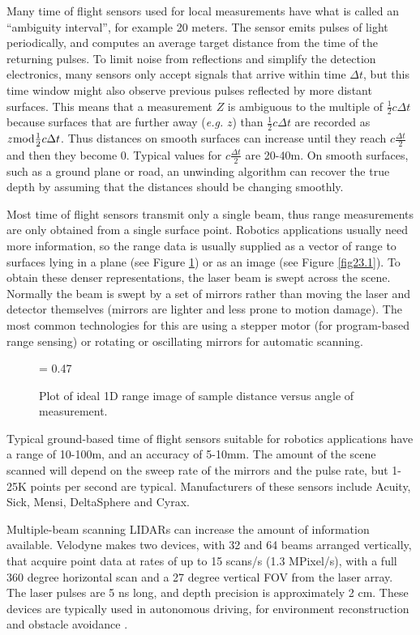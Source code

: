 \documentclass[twocolumn,oneside]{book}
\begin{document}
Many time of flight sensors used for local measurements have what is 
called an ``ambiguity interval'', for example 20 meters.
The sensor emits pulses of light periodically, and computes an average
target distance from the time of the returning pulses. 
To limit noise from reflections and simplify the detection electronics,
many sensors only accept signals that arrive within time $\Delta t$,
but this time window might also observe previous pulses reflected by 
more distant surfaces.
This means that a measurement $Z$ is ambiguous to the multiple of
$\frac{1}{2}c\Delta t$ because surfaces that are further away ({\it e.g.} $z$) than 
$\frac{1}{2}c\Delta t$ are recorded as $z {\rm mod} \frac{1}{2}c\Delta t$.
Thus distances on smooth surfaces can increase until they reach
$c\frac{\Delta t}{2}$ and then they become 0.
Typical values for $c\frac{\Delta t}{2}$ are 20-40m.
On smooth surfaces, such as a ground plane or road, an unwinding algorithm
can recover the true depth by assuming that the distances should be changing
smoothly.

Most time of flight sensors transmit only a single beam, thus range
measurements are only obtained from a single surface point.  Robotics
applications usually need more information, so the range data is
usually supplied as a vector of range to surfaces lying in a plane
(see Figure \ref{lineing}) or as an image (see Figure \ref{fig23.1}).
To obtain these denser representations, the laser beam is swept across
the scene.  Normally the beam is swept by a set of mirrors rather than
moving the laser and detector themselves (mirrors are lighter and less
prone to motion damage).  The most common technologies for this are
using a stepper motor (for program-based range sensing) or rotating or
oscillating mirrors for automatic scanning.
\begin{figure}[htb]
{\epsfxsize = 0.47\textwidth {}}
\caption{Plot of ideal 1D range image of sample distance versus angle of measurement.
\label{lineing}}
\end{figure}

Typical ground-based time of flight sensors suitable for robotics
applications have a range of 10-100m, and an accuracy of 5-10mm.
The amount of the scene scanned will depend on the sweep rate of the 
mirrors and the pulse rate, but 1-25K points per second are typical.
Manufacturers of these sensors include Acuity, Sick, Mensi,
DeltaSphere and Cyrax.

Multiple-beam scanning LIDARs can increase the amount of information
available.  Velodyne \cite{} makes two devices, with 32 and 64 beams
arranged vertically, that acquire point data at rates of up to 15
scans/s (1.3 MPixel/s), with a full 360 degree horizontal scan and a
27 degree vertical FOV from the laser array.  The laser pulses are 5
ns long, and depth precision is approximately 2 cm.  These devices are
typically used in autonomous driving, for environment reconstruction
and obstacle avoidance \cite{}.
\end{document}
